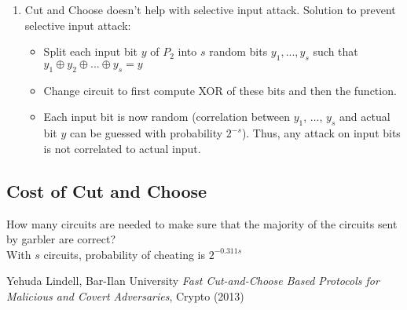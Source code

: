 \begin{enumerate}
    \item Cut and Choose doesn't help with selective input attack. Solution to prevent selective input attack: 
    \begin{itemize}
        \item Split each input bit $y$ of $P_2$ into $s$ random bits $y_1, ..., y_s$ such that $y_1 \oplus y_2 \oplus ... \oplus y_s = y$
        \item Change circuit to first compute XOR of these bits and then the function.
        \item Each input bit is now random (correlation between $y_1$, ..., $y_s$ and actual bit $y$ can be guessed with probability $2^{-s}$). Thus, any attack on input bits is not correlated to actual input.
    \end{itemize}

\end{enumerate}

\subsection{Cost of Cut and Choose}
How many circuits are needed to make sure that the majority of the circuits sent by garbler are correct? \\

With $s$ circuits, probability of cheating is $2^{-0.311s}$

\begin{thebibliography}{99}

 Yehuda Lindell, Bar-Ilan University \emph{Fast Cut-and-Choose Based Protocols for Malicious and Covert Adversaries}, {Crypto} (2013)

\end{thebibliography}

%

